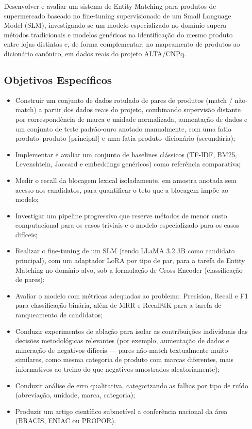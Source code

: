 \documentclass[
    article,
    12pt,
    oneside,
    a4paper,
    english,
    brazilian
    ]{abntex2}
\numberwithin{equation}{section}
\begin{document}
Desenvolver e avaliar um sistema de Entity Matching para produtos de supermercado baseado no fine-tuning supervisionado de um Small Language Model (SLM), investigando se um modelo especializado no domínio supera métodos tradicionais e modelos genéricos na identificação do mesmo produto entre lojas distintas e, de forma complementar, no mapeamento de produtos ao dicionário canônico, em dados reais do projeto ALTA/CNPq.

\subsection{Objetivos Específicos}
\label{sec:objetivos-especificos}

\begin{itemize}
    \item Construir um conjunto de dados rotulado de pares de produtos (match / não-match) a partir dos dados reais do projeto, combinando supervisão distante por correspondência de marca e unidade normalizada, aumentação de dados e um conjunto de teste padrão-ouro anotado manualmente, com uma fatia produto--produto (principal) e uma fatia produto--dicionário (secundária);
    \item Implementar e avaliar um conjunto de baselines clássicos (TF-IDF, BM25, Levenshtein, Jaccard e embeddings genéricos) como referência comparativa;
    \item Medir o recall da blocagem lexical isoladamente, em amostra anotada sem acesso aos candidatos, para quantificar o teto que a blocagem impõe ao modelo;
    \item Investigar um pipeline progressivo que reserve métodos de menor custo computacional para os casos triviais e o modelo especializado para os casos difíceis;
    \item Realizar o fine-tuning de um SLM (tendo LLaMA 3.2 3B como candidato principal), com um adaptador LoRA por tipo de par, para a tarefa de Entity Matching no domínio-alvo, sob a formulação de Cross-Encoder (classificação de pares);
    \item Avaliar o modelo com métricas adequadas ao problema: Precision, Recall e F1 para classificação binária, além de MRR e Recall@K para a tarefa de ranqueamento de candidatos;
    \item Conduzir experimentos de ablação para isolar as contribuições individuais das decisões metodológicas relevantes (por exemplo, aumentação de dados e mineração de negativos difíceis --- pares não-match textualmente muito similares, como mesma categoria de produto com marcas diferentes, mais informativos ao treino do que negativos amostrados aleatoriamente);
    \item Conduzir análise de erro qualitativa, categorizando as falhas por tipo de ruído (abreviação, unidade, marca, categoria);
    \item Produzir um artigo científico submetível a conferência nacional da área (BRACIS, ENIAC ou PROPOR).
\end{itemize}
\end{document}
